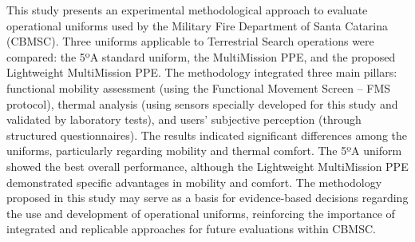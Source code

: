 This study presents an experimental methodological approach to evaluate operational uniforms used by 
the Military Fire Department of Santa Catarina (CBMSC). Three uniforms applicable to Terrestrial 
Search operations were compared: the 5ºA standard uniform, the MultiMission PPE, and the proposed 
Lightweight MultiMission PPE. The methodology integrated three main pillars: functional mobility 
assessment (using the Functional Movement Screen – FMS protocol), thermal analysis (using sensors 
specially developed for this study and validated by laboratory tests), and users’ subjective perception 
(through structured questionnaires). The results indicated significant differences among the uniforms, 
particularly regarding mobility and thermal comfort. The 5ºA uniform showed the best overall performance, 
although the Lightweight MultiMission PPE demonstrated specific advantages in mobility and comfort. 
The methodology proposed in this study may serve as a basis for evidence-based decisions regarding the 
use and development of operational uniforms, reinforcing the importance of integrated and replicable 
approaches for future evaluations within CBMSC.